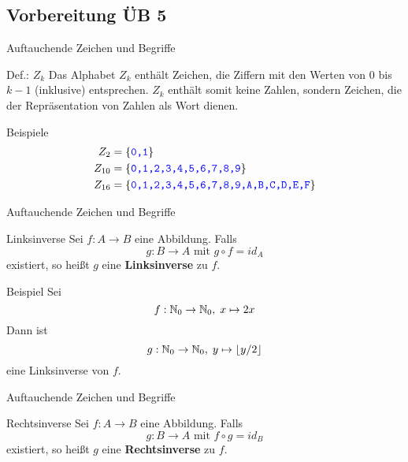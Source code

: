 \subsection{Vorbereitung ÜB 5}
\begin{frame}{Auftauchende Zeichen und Begriffe}
	\begin{block}{Def.: $Z_k$}
		Das Alphabet $Z_k$ enthält Zeichen, die Ziffern mit den Werten von $0$ bis $k-1$ (inklusive) entsprechen. $Z_k$ enthält somit keine Zahlen, sondern Zeichen, die der Repräsentation von Zahlen als Wort dienen.
	\end{block}

	\begin{exampleblock}{Beispiele}
		\begin{align*}
			Z_{2} &= \left\{ \texttt{\textcolor{blue}{0,1}} \right\}\\
			Z_{10} &= \left\{ \texttt{\textcolor{blue}{0,1,2,3,4,5,6,7,8,9}} \right\}\\
			Z_{16} &= \left\{ \texttt{\textcolor{blue}{0,1,2,3,4,5,6,7,8,9,A,B,C,D,E,F}} \right\}
		\end{align*}
	\end{exampleblock}
\end{frame}

\begin{frame}{Auftauchende Zeichen und Begriffe}
	
	\begin{block}{Linksinverse}
		Sei $f:A \to B$ eine Abbildung. Falls \[ g:B\to A \text{ mit } g \circ f = id_A\]
		existiert, so heißt $g$ eine \textbf{Linksinverse} zu $f$.
	\end{block}

	\begin{exampleblock}{Beispiel}
		Sei \[f: \mathbb{N}_0 \to \mathbb{N}_0, \; x \mapsto 2x\]
		Dann ist \[ g: \mathbb{N}_0 \to \mathbb{N}_0, \; y \mapsto \lfloor y/2 \rfloor \]
		eine Linksinverse von $f$.
	\end{exampleblock}

\end{frame}

\begin{frame}{Auftauchende Zeichen und Begriffe}

	\begin{block}{Rechtsinverse}
		Sei $f:A \to B$ eine Abbildung. Falls \[ g:B\to A \text{ mit } f \circ g = id_B\]
		existiert, so heißt $g$ eine \textbf{Rechtsinverse} zu $f$.
	\end{block}

\end{frame}